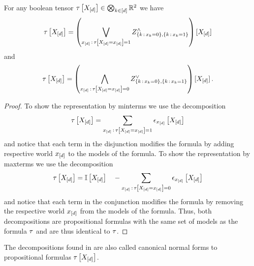 \begin{theorem}
    \label{the:tensorToMaxMinTerms}
    For any boolean tensor $\tau\left[X_{[d]}\right]\in\bigotimes_{k\in[d]}\mathbb{R}^2$  we have
    \begin{align*}
        \tau\left[X_{[d]}\right] = \left( \bigvee_{x_{[d]}\,:\,\tau\left[X_{[d]}=x_{[d]}\right] = 1}
        Z^{\land}_{\{k\,:\,x_{k}=0\},\{k\,:\,x_{k}=1\}}
        \right)
        [X_{[d]}]
    \end{align*}
    and
    \begin{align*}
        \tau\left[X_{[d]}\right] = \left( \bigwedge_{x_{[d]}\,:\,\tau\left[X_{[d]}=x_{[d]}\right] = 0}
        Z^{\lor}_{\{k\,:\,x_{k}=0\},\{k\,:\,x_{k}=1\}}
        \right)
        [X_{[d]}] \, .
    \end{align*}
\end{theorem}
\begin{proof}
    To show the representation by minterms we use the decomposition
    \begin{align*}
        \tau\left[X_{[d]}\right]  = \sum_{x_{[d]}\,:\,\tau\left[X_{[d]}=x_{[d]}\right] = 1} \epsilon_{x_{[d]}}\left[X_{[d]}\right]
    \end{align*}
    and notice that each term in the disjunction modifies the formula by adding respective world $x_{[d]}$ to the models of the formula.
    To show the representation by maxterms we use the decomposition
    \begin{align*}
        \tau\left[X_{[d]}\right]  = \mathbb{I}\left[X_{[d]}\right] \quad - \sum_{x_{[d]}\,:\,\tau\left[X_{[d]}=x_{[d]}\right] = 0} \epsilon_{x_{[d]}}\left[X_{[d]}\right]
    \end{align*}
    and notice that each term in the conjunction modifies the formula by removing the respective world $x_{[d]}$ from the models of the formula.
    Thus, both decompositions are propositional formulas with the same set of models as the formula $\tau$ and are thus identical to $\tau$.
\end{proof}


The decompositions found in  are also called canonical normal forms to propositional formulas $\tau\left[X_{[d]}\right]$.

